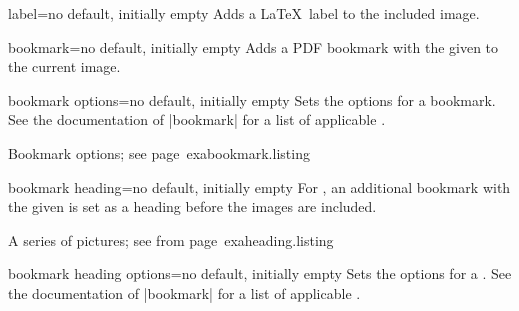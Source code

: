 \documentclass[a4paper,11pt]{ltxdoc}
\begin{document}
\clearpage

\begin{docIgrKey}{label}{=}{no default, initially empty}
  Adds a \LaTeX\ label to the included image.
\end{docIgrKey}


\begin{docIgrKey}{bookmark}{=}{no default, initially empty}
  Adds a PDF bookmark with the given  to the current image.
\end{docIgrKey}

\begin{docIgrKey}{bookmark options}{=}{no default, initially empty}
  Sets the options for a bookmark.
  See the documentation of
  |bookmark| \cite{oberdiek:bookmark} for a list of applicable .
\begin{texexptitled}%
  {Bookmark options; see page~\pageref{exabookmark}}{exabookmark.listing}
\end{texexptitled}
\end{docIgrKey}

\begin{docIgrKey}{bookmark heading}{=}{no default, initially empty}
  For , an additional bookmark with the given 
  is set as a heading before the images are included.
\begin{texexptitled}%
  {A series of pictures; see from page~\pageref{exaheading.1}}{exaheading.listing}
\end{texexptitled}
\end{docIgrKey}

\begin{docIgrKey}{bookmark heading options}{=}{no default, initially empty}
  Sets the options for a .
  See the documentation of
  |bookmark| \cite{oberdiek:bookmark} for a list of applicable .
\end{docIgrKey}
\end{document}

